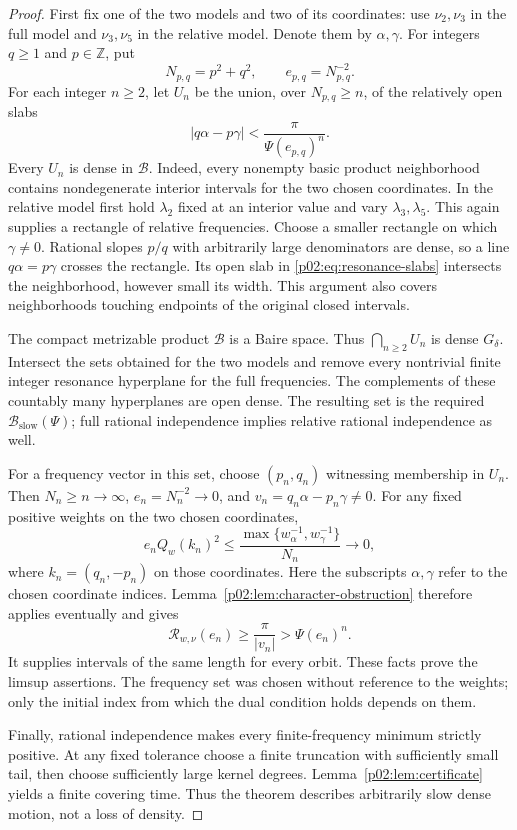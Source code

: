 \documentclass[11pt,letterpaper]{article}
\theoremstyle{definition}
\theoremstyle{remark}
\newcommand{\1}{\mathbf 1}
\begin{document}
\begin{proof}
First fix one of the two models and two of its coordinates: use
$\nu_2,\nu_3$ in the full model and $\nu_3,\nu_5$ in the relative
model. Denote them by $\alpha,\gamma$. For integers $q\ge1$ and
$p\in\mathbb Z$, put
\[
 N_{p,q}=p^2+q^2,\qquad e_{p,q}=N_{p,q}^{-2}.
\]
For each integer $n\ge2$, let $U_n$ be the union, over
$N_{p,q}\ge n$, of the relatively open slabs
\begin{equation}\label{p02:eq:resonance-slabs}
 |q\alpha-p\gamma|
 <\frac\pi{\Psi(e_{p,q})^n}.
\end{equation}
Every $U_n$ is dense in $\mathcal B$. Indeed, every nonempty basic
product neighborhood contains nondegenerate interior intervals for
the two chosen coordinates. In the relative model first hold
$\lambda_2$ fixed at an interior value and vary $\lambda_3,\lambda_5$.
This again supplies a rectangle of relative frequencies. Choose a
smaller rectangle on which $\gamma\ne0$. Rational slopes $p/q$ with
arbitrarily large denominators are dense, so a line
$q\alpha=p\gamma$ crosses the rectangle. Its open slab in
\eqref{p02:eq:resonance-slabs} intersects the neighborhood, however small
its width. This argument also covers neighborhoods touching endpoints
of the original closed intervals.

The compact metrizable product $\mathcal B$ is a Baire space. Thus
$\bigcap_{n\ge2}U_n$ is dense $G_\delta$. Intersect the sets obtained
for the two models and remove every nontrivial finite integer
resonance hyperplane for the full frequencies. The complements of
these countably many hyperplanes are open dense. The resulting set
is the required $\mathcal B_{\mathrm{slow}}(\Psi)$; full rational
independence implies relative rational independence as well.

For a frequency vector in this set, choose $(p_n,q_n)$ witnessing
membership in $U_n$. Then $N_n\ge n\to\infty$,
$e_n=N_n^{-2}\to0$, and $v_n=q_n\alpha-p_n\gamma\ne0$.
For any fixed positive weights on the two chosen coordinates,
\[
 e_n Q_w(k_n)^2
 \le\frac{\max\{w_{\alpha}^{-1},w_{\gamma}^{-1}\}}{N_n}
 \longrightarrow0,
\]
where $k_n=(q_n,-p_n)$ on those coordinates. Here the subscripts
$\alpha,\gamma$ refer to the chosen coordinate indices.
Lemma~\ref{p02:lem:character-obstruction} therefore applies eventually
and gives
\[
 \mathcal R_{w,\nu}(e_n)\ge\frac\pi{|v_n|}
 >\Psi(e_n)^n.
\]
It supplies intervals of the same length for every orbit. These
facts prove the limsup assertions. The frequency set was chosen
without reference to the weights; only the initial index from which
the dual condition holds depends on them.

Finally, rational independence makes every finite-frequency minimum
strictly positive. At any fixed tolerance choose a finite truncation
with sufficiently small tail, then choose sufficiently large kernel
degrees. Lemma~\ref{p02:lem:certificate} yields a finite covering time.
Thus the theorem describes arbitrarily slow dense motion, not a loss
of density.
\end{proof}
\end{document}
